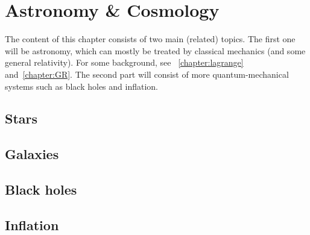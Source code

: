 \chapter{Astronomy \& Cosmology}

    The content of this chapter consists of two main (related) topics. The first one will be astronomy, which can mostly be treated by classical mechanics (and some general relativity). For some background, see ~\ref{chapter:lagrange} and~\ref{chapter:GR}. The second part will consist of more quantum-mechanical systems such as black holes and inflation.

    \minitoc

\section{Stars}


\section{Galaxies}


\section{Black holes}


\section{Inflation}

